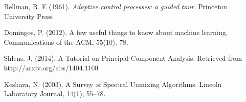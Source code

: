 \documentclass[a4paper]{article}
\begin{document}
\begin{thebibliography}{9}
 Bellman, R. E (1961). \emph{Adaptive control processes: a guided tour.} Princeton University Press

 Domingos, P. (2012). A few useful things to know about machine learning. Communications of the ACM, 55(10), 78. 

 Shlens, J. (2014). A Tutorial on Principal Component Analysis. Retrieved from http://arxiv.org/abs/1404.1100

 Keshava, N. (2003). A Survey of Spectral Unmixing Algorithms. Lincoln Laboratory Journal, 14(1), 55–78. 

\end{thebibliography}

\end{document}
